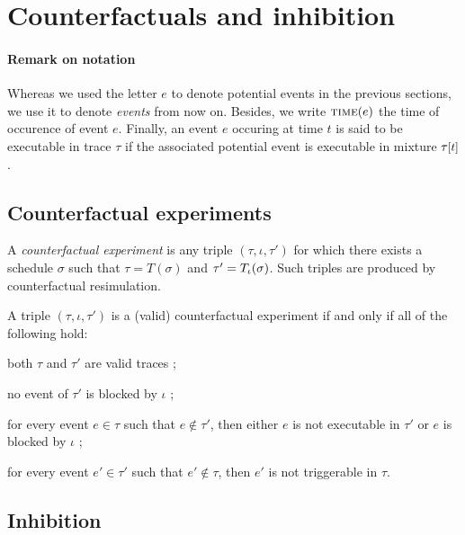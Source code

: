 
\section{Counterfactuals and inhibition}\label{sec:inhibition}

\paragraph{Remark on notation} Whereas we used the letter $e$ to
denote potential events in the previous sections, we use it to denote
\emph{events} from now on. Besides, we write $\textsc{time}(e)$ the time of
occurence of event $e$. Finally, an event $e$ occuring at time $t$ is
said to be executable in trace $\tau$ if the associated potential
event is executable in mixture $\TSTATE{t}{\tau}$.


\subsection{Counterfactual experiments}

A \textit{counterfactual experiment} is any triple
$(\tau, \iota, \tau')$ for which there exists a schedule $\sigma$ such
that $\tau = T(\sigma)$ and $\tau' = {T_\iota}{}(\sigma)$. Such triples
are produced by counterfactual resimulation.

\begin{proposition}%
  \label{prop:valid-cex}
  A triple $(\tau, \iota, \tau')$ is a (valid) counterfactual experiment if
  and only if all of the following hold:
  \begin{inparaenum}[(1)]
  \item \label{valid-cex:valid-traces} both $\tau$ and $\tau'$ are
    valid traces ;
  \item \label{valid-cex:no-blocking} no event of $\tau'$ is blocked
    by $\iota$ ;
  \item \label{valid-cex:co-occur} for every event $e \in \tau$
    such that $e \notin \tau'$, then either $e$ is not
    executable in $\tau'$ or $e$ is blocked by
    $\iota$ ;
  \item \label{valid-cex:co-occur2} for every event $e' \in \tau'$
    such that $e' \notin \tau$, then $e'$ is not triggerable in
    $\tau$.
  \end{inparaenum}
\end{proposition}

\subsection{Inhibition}


